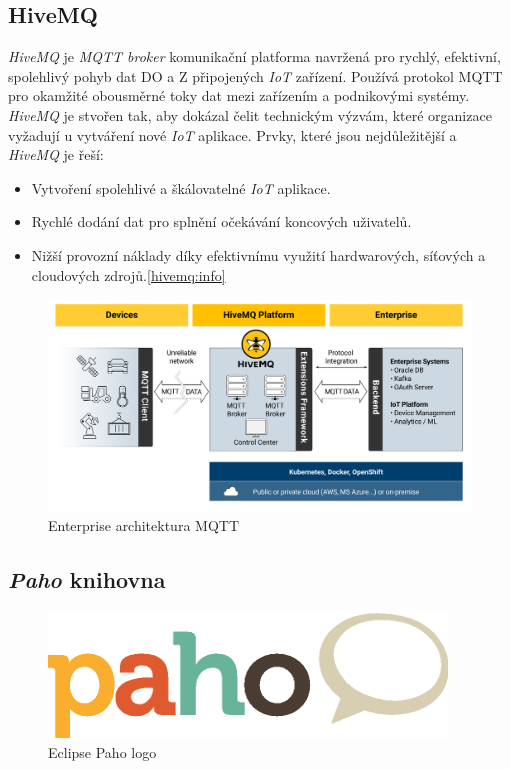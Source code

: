 \newpage
\subsection*{HiveMQ}
\label{pouzite:hivemq}

\emph{HiveMQ} je \emph{MQTT broker} komunikační platforma navržená pro rychlý, efektivní, spolehlivý pohyb dat DO a Z připojených \emph{IoT} zařízení.
Používá protokol MQTT pro okamžité obousměrné toky dat mezi zařízením a podnikovými systémy.
\emph{HiveMQ} je stvořen tak, aby dokázal čelit technickým výzvám, které organizace vyžadují u vytváření nové \emph{IoT} aplikace.
\newline
Prvky, které jsou nejdůležitější a \emph{HiveMQ} je řeší:
\begin{itemize}
  \item Vytvoření spolehlivé a škálovatelné \emph{IoT} aplikace.
  \item Rychlé dodání dat pro splnění očekávání koncových uživatelů.
  \item Nižší provozní náklady díky efektivnímu využití hardwarových, síťových a cloudových zdrojů.\ref{hivemq:info}
\end{itemize}

\begin{figure}[hbt]
  \centering
  \includegraphics[width=1 \linewidth]{obrazky-figures/hivemq_arch.png}
  \caption{Enterprise architektura MQTT}
  \label{figure:hivemq_flow}
\end{figure}

\subsection*{\emph{Paho} knihovna}
\label{pouzite:paho}
\begin{figure}[hbt]
  \centering
  \includegraphics[width=.2 \linewidth]{obrazky-figures/paho.png}
  \caption{Eclipse Paho logo}
  \label{figure:paho}
\end{figure}

